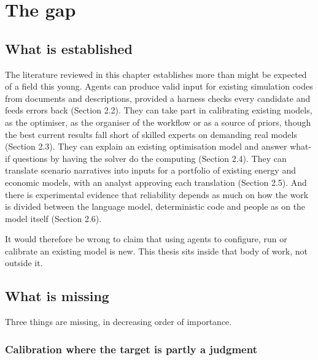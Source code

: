 \section{The gap}

\subsection{What is established}

The literature reviewed in this chapter establishes more than might be expected of a field this young.
Agents can produce valid input for existing simulation codes from documents and descriptions, provided a harness checks every candidate and feeds errors back (Section 2.2).
They can take part in calibrating existing models, as the optimiser, as the organiser of the workflow or as a source of priors, though the best current results fall short of skilled experts on demanding real models (Section 2.3).
They can explain an existing optimisation model and answer what-if questions by having the solver do the computing (Section 2.4).
They can translate scenario narratives into inputs for a portfolio of existing energy and economic models, with an analyst approving each translation (Section 2.5).
And there is experimental evidence that reliability depends as much on how the work is divided between the language model, deterministic code and people as on the model itself (Section 2.6).

It would therefore be wrong to claim that using agents to configure, run or calibrate an existing model is new.
This thesis sits inside that body of work, not outside it.

\subsection{What is missing}

Three things are missing, in decreasing order of importance.

\subsubsection{Calibration where the target is partly a judgment}

